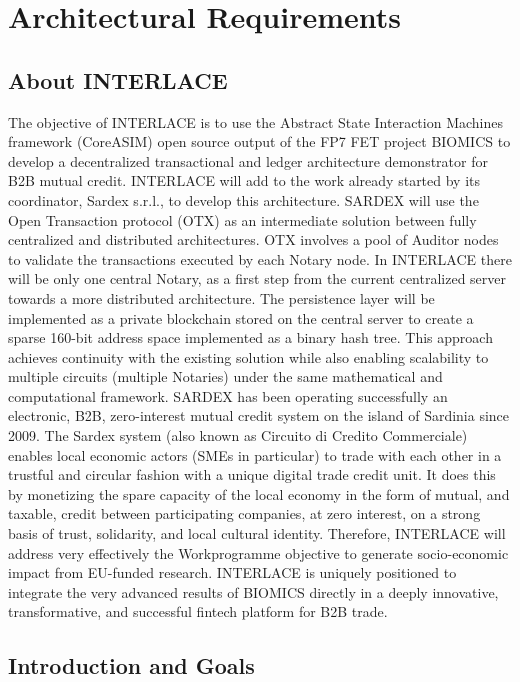 \chapter{Architectural Requirements}
\label{ch:archreq}
\section{\textbf{About INTERLACE}}

The objective of INTERLACE is to use the Abstract State Interaction Machines framework (CoreASIM) open source output of the FP7 FET project BIOMICS to develop a decentralized transactional and ledger architecture demonstrator for B2B mutual credit. INTERLACE will add to the work already started by its coordinator, Sardex s.r.l., to develop this architecture.
SARDEX will use the Open Transaction protocol (OTX) as an intermediate solution between fully centralized and distributed
architectures. OTX involves a pool of Auditor nodes to validate the transactions executed by each Notary node. In
INTERLACE there will be only one central Notary, as a first step from the current centralized server towards a more
distributed architecture. The persistence layer will be implemented as a private blockchain stored on the central server to
create a sparse 160-bit address space implemented as a binary hash tree. This approach achieves continuity with the
existing solution while also enabling scalability to multiple circuits (multiple Notaries) under the same mathematical and
computational framework. SARDEX has been operating successfully an electronic, B2B, zero-interest mutual credit system
on the island of Sardinia since 2009. The Sardex system (also known as Circuito di Credito Commerciale) enables local
economic actors (SMEs in particular) to trade with each other in a trustful and circular fashion with a unique digital trade
credit unit. It does this by monetizing the spare capacity of the local economy in the form of mutual, and taxable, credit
between participating companies, at zero interest, on a strong basis of trust, solidarity, and local cultural identity. Therefore,
INTERLACE will address very effectively the Workprogramme objective to generate socio-economic impact from EU-funded
research. INTERLACE is uniquely positioned to integrate the very advanced results of BIOMICS directly in a deeply
innovative, transformative, and successful fintech platform for B2B trade.

\section{Introduction and Goals}\label{section-introduction-and-goals}

